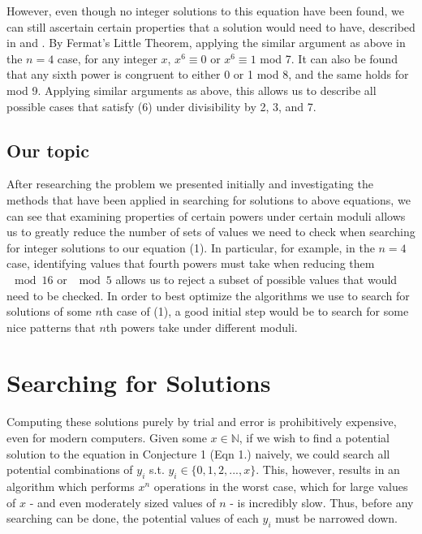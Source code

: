 \documentclass{article}
\begin{document}
\begin{flushleft}
However, even though no integer solutions to this equation have been found, we can still ascertain certain properties that a solution would need to have, described in \cite{ansell} and \cite{lander}. By Fermat's Little Theorem, applying the similar argument as above in the $n=4$ case, for any integer $x$, $x^6 \equiv 0 $ or $x^6 \equiv 1 $ mod 7. It can also be found that any sixth power is congruent to either 0 or 1 mod 8, and the same holds for mod 9. Applying similar arguments as above, this allows us to describe all possible cases that satisfy (6) under divisibility by 2, 3, and 7. 

\subsection{Our topic}
After researching the problem we presented initially and investigating the methods that have been applied in searching for solutions to above equations, we can see that examining properties of certain powers under certain moduli allows us to greatly reduce the number of sets of values we need to check when searching for integer solutions to our equation (1). In particular, for example, in the $n=4$ case, identifying values that fourth powers must take when reducing them $\mod 16$ or $\mod 5$ allows us to reject a subset of possible values that would need to be checked. In order to best optimize the algorithms we use to search for solutions of some $n$th case of (1), a good initial step would be to search for some nice patterns that $n$th powers take under different moduli. 

\section{Searching for Solutions}
Computing these solutions purely by trial and error is prohibitively expensive, even for modern computers. Given some $x \in \mathbb{N}$, if we wish to find a potential solution to the equation in Conjecture 1 (Eqn 1.) naively, we could search all potential combinations of $y_i$ s.t. $y_i \in \{0, 1, 2, ..., x\}$. This, however, results in an algorithm which performs $x^n$ operations in the worst case, which for large values of $x$ - and even moderately sized values of $n$ - is incredibly slow. Thus, before any searching can be done, the potential values of each $y_i$ must be narrowed down.

\vspace{.1in}


\end{flushleft}
\end{document}
